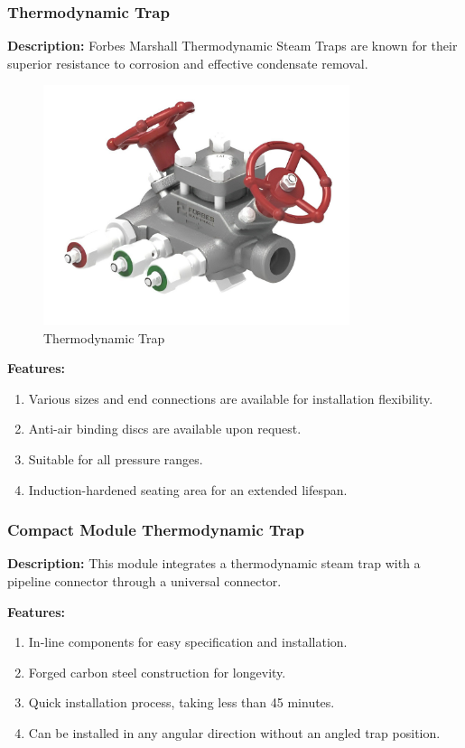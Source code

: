 \subsubsection{Thermodynamic Trap}

\textbf{Description:} Forbes Marshall Thermodynamic Steam Traps are known for their superior resistance to corrosion and effective condensate removal.

\begin{figure}[h]
    \centering
    \includegraphics[width=0.8\textwidth,height=0.33\textheight,keepaspectratio]{figs/lastmin/thermodynamic_trap.png}
    \caption{Thermodynamic Trap}
    \label{fig:thermodynamic_trap}
\end{figure}

\textbf{Features:}
\begin{enumerate}
    \item Various sizes and end connections are available for installation flexibility.
    \item Anti-air binding discs are available upon request.
    \item Suitable for all pressure ranges.
    \item Induction-hardened seating area for an extended lifespan.
\end{enumerate}
\subsubsection{Compact Module Thermodynamic Trap}

\textbf{Description:} This module integrates a thermodynamic steam trap with a pipeline connector through a universal connector.

\textbf{Features:}
\begin{enumerate}
    \item In-line components for easy specification and installation.
    \item Forged carbon steel construction for longevity.
    \item Quick installation process, taking less than 45 minutes.
    \item Can be installed in any angular direction without an angled trap position.
\end{enumerate}

